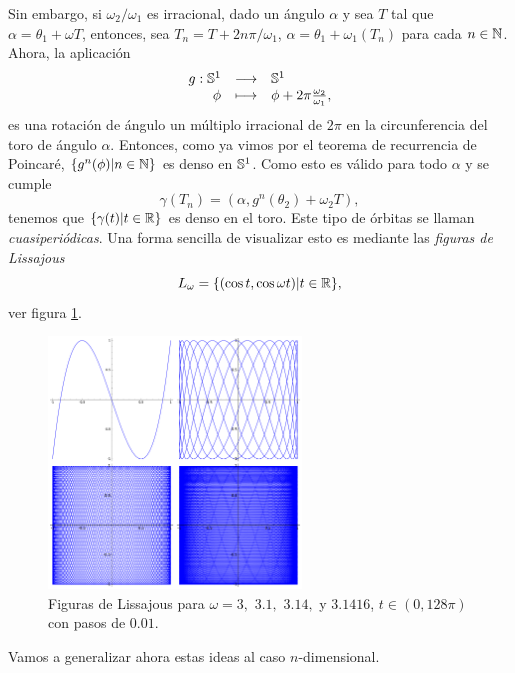   Sin embargo, si $\omega_2/\omega_1$ es irracional, dado un ángulo $\alpha$ y sea $T$ tal que $\alpha=\theta_1+\omega T$, entonces, sea $T_n=T+2n\pi/\omega_1$, $\alpha=\theta_1+\omega_1(T_n)$ para cada $n\in \mathbb{N}$. Ahora, la aplicación
  \begin{equation*}
    \begin{array}{rcl}
    g:\mathbb{S}^1 & \longrightarrow &\mathbb{S}^1 \\
  \phi & \longmapsto & \phi + 2\pi\frac{\omega_2}{\omega_1},
  \end{array}
\end{equation*}
es una rotación de ángulo un múltiplo irracional de $2\pi$ en la circunferencia del toro de ángulo $\alpha$. Entonces, como ya vimos por el teorema de recurrencia de Poincaré, $\{g^n(\phi)|n\in \mathbb{N}\}$ es denso en $\mathbb{S}^1$. Como esto es válido para todo $\alpha$ y se cumple 
\begin{equation*}
  \gamma(T_n)=(\alpha,g^n(\theta_2)+\omega_2 T),
\end{equation*}
tenemos que $\{\gamma(t)|t \in \mathbb{R} \}$ es denso en el toro. Este tipo de órbitas se llaman \emph{cuasiperiódicas}. Una forma sencilla de visualizar esto es mediante las \emph{figuras de Lissajous} 
\begin{equation*}
  L_{\omega}=\{(\cos t, \cos \omega t) | t \in \mathbb{R}\},
\end{equation*}
ver figura \ref{fig:lissajous}.
\begin{figure}[h!]
  \centering
  \includegraphics[width=0.6\textwidth]{pics/lissajous}
  \caption{\small Figuras de Lissajous para $\omega=3,$ $3.1,$ $3.14,$  y $3.1416$, $t \in (0,128\pi)$ con pasos de $0.01$.}
  \label{fig:lissajous}
\end{figure}

Vamos a generalizar ahora estas ideas al caso $n$-dimensional.

